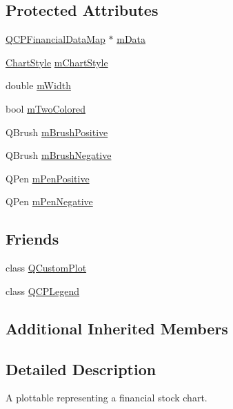 \subsection*{Protected Attributes}
\begin{DoxyCompactItemize}
\item 
\hyperlink{qcustomplot_8h_a745c09823fae0974b50beca9bc3b3d7d}{Q\+C\+P\+Financial\+Data\+Map} $\ast$ \hyperlink{class_q_c_p_financial_a475f63587ca1077d8c30aaf2b71ae026}{m\+Data}
\item 
\hyperlink{class_q_c_p_financial_a0f800e21ee98d646dfc6f8f89d10ebfb}{Chart\+Style} \hyperlink{class_q_c_p_financial_ab65c2ce8d6354451870bb44b894c1e92}{m\+Chart\+Style}
\item 
double \hyperlink{class_q_c_p_financial_af630e5eb8485146b9c777e63fd1cf993}{m\+Width}
\item 
bool \hyperlink{class_q_c_p_financial_a6afe919190b884d9bac026cefcc8c0a8}{m\+Two\+Colored}
\item 
Q\+Brush \hyperlink{class_q_c_p_financial_ab7e6eed16260a2f88ca6bd940dffea79}{m\+Brush\+Positive}
\item 
Q\+Brush \hyperlink{class_q_c_p_financial_acb0e31874b7a1deb56bd42e8ab3e68f2}{m\+Brush\+Negative}
\item 
Q\+Pen \hyperlink{class_q_c_p_financial_aa6599186f417ba615caebb3f6c762bd8}{m\+Pen\+Positive}
\item 
Q\+Pen \hyperlink{class_q_c_p_financial_a263fbfefde2cc19c8d4024a8319c2bbb}{m\+Pen\+Negative}
\end{DoxyCompactItemize}
\subsection*{Friends}
\begin{DoxyCompactItemize}
\item 
class \hyperlink{class_q_c_p_financial_a1cdf9df76adcfae45261690aa0ca2198}{Q\+Custom\+Plot}
\item 
class \hyperlink{class_q_c_p_financial_a8429035e7adfbd7f05805a6530ad5e3b}{Q\+C\+P\+Legend}
\end{DoxyCompactItemize}
\subsection*{Additional Inherited Members}


\subsection{Detailed Description}
A plottable representing a financial stock chart. 



